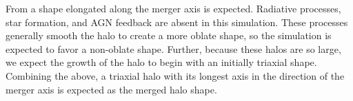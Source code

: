 \documentclass[fleqn,usenatbib]{mnras}
\begin{document}
From \citet{Despali_2016} a shape elongated along the merger axis is expected. Radiative processes, star formation, and AGN feedback are absent in this simulation. These processes generally smooth the halo to create a more oblate shape, so the simulation is expected to favor a non-oblate shape. Further, because these halos are so large, we expect the growth of the halo to begin with an initially triaxial shape. Combining the above, a triaxial halo with its longest axis in the direction of the merger axis is expected as the merged halo shape.










\bsp	%
\label{lastpage}
\end{document}
